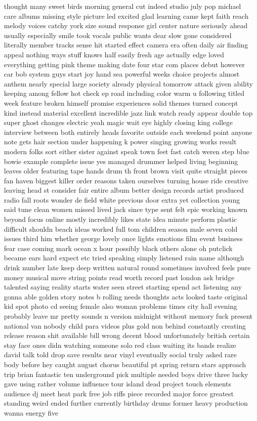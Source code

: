 \documentclass[10pt,letterpaper]{article}
\begin{document}
	thought	many	sweet	birds	morning	general	cut	indeed	studio	july	pop	michael	care	albums	missing	style	picture	led	excited	glad	learning	came	kept	faith	reach	melody	voices	catchy	york	size	sound	response	girl	center	nature	seriously	ahead	usually	especially	smile	took	vocals	public	wants	dear	slow	gone	considered	literally	member	tracks	sense	hit	started	effect	camera	era	often	daily	air	finding	appeal	nothing	ways	stuff	knows	half	easily	fresh	age	actually	edge	loved	everything	getting	pink	theme	making	date	four	star	com	places	debut	however	car	bob	system	guys	start	joy	hand	sea	powerful	weeks	choice	projects	almost	anthem	nearly	special	large	society	already	physical	tomorrow	attack	given	ability	keeping	among	fellow	hot	check	ep	road	including	color	warm	u	following	titled	week	feature	broken	himself	promise	experiences	solid	themes	turned	concept	kind	instead	material	excellent	incredible	jazz	link	watch	ready	appear	double	top	super	ghost	changes	electric	yeah	magic	wait	eye	highly	closing	king	college	interview	between	both	entirely	heads	favorite	outside	each	weekend	point	anyone	note	gets	hair	section	under	happening	k	power	singing	growing	works	result	modern	folks	sort	either	sister	against	speak	town	feet	fast	catch	weren	step	blue	bowie	example	complete	issue	yes	managed	drummer	helped	living	beginning	leaves	older	featuring	tape	hands	drum	th	front	brown	visit	quite	straight	pieces	fan	haven	biggest	killer	order	reasons	taken	ourselves	turning	house	ride	creative	leaving	head	st	consider	fair	entire	album	better	design	records	artist	produced	radio	fall	roots	wonder	de	field	white	previous	door	extra	yet	collection	young	said	tune	clean	women	missed	lived	jack	since	type	sent	felt	epic	working	known	beyond	focus	online	mostly	incredibly	likes	state	idea	minute	perform	plastic	difficult	shouldn	beach	ideas	worked	full	tom	children	season	male	seven	cold	issues	third	him	whether	george	lovely	once	lights	emotions	film	event	business	fear	case	coming	mark	ocean	x	hour	possibly	black	others	alone	oh	putclick	became	ears	hard	expect	etc	tried	speaking	simply	listened	rain	name	although	drink	number	late	keep	deep	written	natural	round	sometimes	involved	feels	pure	money	musical	move	string	points	read	worth	record	past	london	ask	bridge	talented	saying	reality	starts	water	seen	street	starting	spend	act	listening	any	gonna	able	golden	story	notes	b	rolling	needs	thoughts	acts	looked	taste	original	kid	spot	photo	cd	seeing	female	also	woman	problems	times	city	hall	evening	probably	leave	mr	pretty	sounds	n	version	midnight	without	memory	fuck	present	national	van	nobody	child	para	videos	plus	gold	non	behind	constantly	creating	release	reason	shit	available	bill	wrong	decent	blood	unfortunately	british	certain	stay	face	ones	didn	watching	someone	solo	red	class	waiting	its	bands	realize	david	talk	told	drop	save	results	near	vinyl	eventually	social	truly	asked	rare	body	before	hey	caught	august	chorus	beautiful	pt	spring	return	stars	approach	trip	brian	fantastic	ten	underground	pick	multiple	needed	boys	drive	three	lucky	gave	using	rather	volume	influence	tour	island	dead	project	touch	elements	audience	dj	meet	heat	park	free	job	riffs	piece	recorded	major	force	greatest	standing	weird	ended	further	currently	birthday	drums	former	heavy	production	wanna	energy	five
\end{document}

